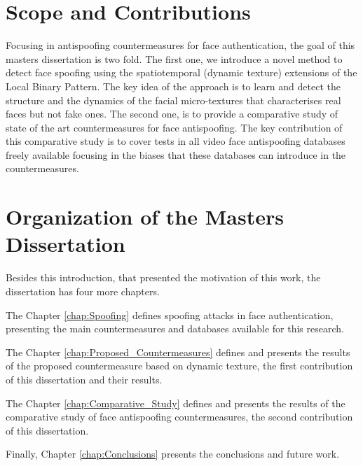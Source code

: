\section{Scope and Contributions}
\label{sec:scope}

Focusing in antispoofing countermeasures for face authentication, the goal of this masters dissertation is two fold. The first one, we introduce a novel method to detect face spoofing using the spatiotemporal (dynamic texture) extensions of the Local Binary Pattern. The key idea of the approach is to learn and detect the structure and the dynamics of the facial micro-textures that characterises real faces but not fake ones. The second one, is to provide a comparative study of state of the art countermeasures for face antispoofing. The key contribution of this comparative study is to cover tests in all video face antispoofing databases freely available focusing in the biases that these databases can introduce in the countermeasures.

\section{Organization of the Masters Dissertation}
\label{sec:scope}

Besides this introduction, that presented the motivation of this work, the dissertation has four more chapters. 

The Chapter \ref{chap:Spoofing} defines spoofing attacks in face authentication, presenting the main countermeasures and databases available for this research.

The Chapter \ref{chap:Proposed_Countermeasures} defines and presents the results of the proposed countermeasure based on dynamic texture, the first contribution of this dissertation and their results.

The Chapter \ref{chap:Comparative_Study} defines and presents the results of the comparative study of face antispoofing countermeasures, the second contribution of this dissertation.

Finally, Chapter \ref{chap:Conclusions} presents the conclusions and future work.
